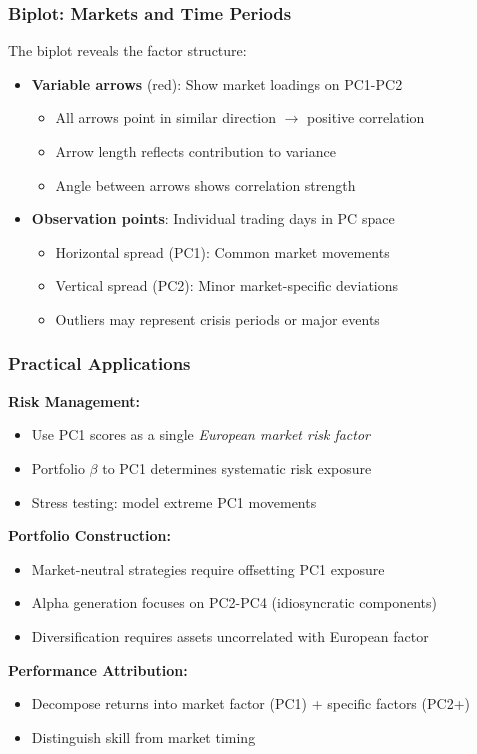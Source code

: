 \documentclass[aspectratio=169]{beamer}
\begin{document}
\begin{frame}
    \frametitle{Biplot: Markets and Time Periods}
    The biplot reveals the factor structure:
    \begin{itemize}
        \item \textbf{Variable arrows} (red): Show market loadings on PC1-PC2 \pause
              \begin{itemize}
                  \item All arrows point in similar direction $\rightarrow$ positive correlation \pause
                  \item Arrow length reflects contribution to variance \pause
                  \item Angle between arrows shows correlation strength \pause
              \end{itemize}
        \item \textbf{Observation points}: Individual trading days in PC space \pause
              \begin{itemize}
                  \item Horizontal spread (PC1): Common market movements \pause
                  \item Vertical spread (PC2): Minor market-specific deviations \pause
                  \item Outliers may represent crisis periods or major events \pause
              \end{itemize}
    \end{itemize}
\end{frame}

\begin{frame}
    \frametitle{Practical Applications}
    \textbf{Risk Management:}
    \begin{itemize}
        \item Use PC1 scores as a single \textit{European market risk factor} \pause
        \item Portfolio $\beta$ to PC1 determines systematic risk exposure \pause
        \item Stress testing: model extreme PC1 movements \pause
    \end{itemize}
    \vspace{6pt}
    \textbf{Portfolio Construction:}
    \begin{itemize}
        \item Market-neutral strategies require offsetting PC1 exposure \pause
        \item Alpha generation focuses on PC2-PC4 (idiosyncratic components) \pause
        \item Diversification requires assets uncorrelated with European factor \pause
    \end{itemize}
    \vspace{6pt}
    \textbf{Performance Attribution:}
    \begin{itemize}
        \item Decompose returns into market factor (PC1) + specific factors (PC2+) \pause
        \item Distinguish skill from market timing \pause
    \end{itemize}
\end{frame}
\end{document}
